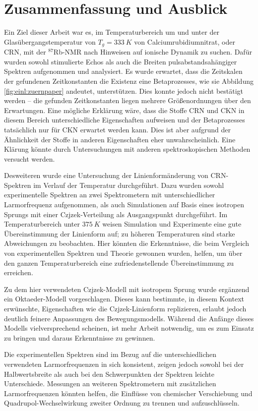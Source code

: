 \chapter{Zusammenfassung und Ausblick}

Ein Ziel dieser Arbeit war es, im Temperaturbereich um und unter der Glasübergangstemperatur von $T_g = \SI{333}{K}$ von Calciumrubidiumnitrat, oder CRN, mit der $^\text{87}$Rb-NMR nach Hinweisen auf ionische Dynamik zu suchen. Dafür wurden sowohl stimulierte Echos als auch die Breiten pulsabstandsahängiger Spektren aufgenommen und analysiert. Es wurde erwartet, dass die Zeitskalen der gefundenen Zeitkonstanten die Existenz eine Betaprozesses, wie sie Abbildung \ref{fig:einl:zuernpaper} andeutet, unterstützen. Dies konnte jedoch nicht bestätigt werden -- die gefunden Zeitkonstanten liegen mehrere Größenordnungen über den Erwartungen. Eine mögliche Erklärung wäre, dass die Stoffe CRN und CKN in diesem Bereich unterschiedliche Eigenschaften aufweisen und der Betaprozesses tatsächlich nur für CKN erwartet werden kann. Dies ist aber aufgrund der Ähnlichkeit der Stoffe in anderen Eigenschaften eher unwahrscheinlich. Eine Klärung könnte durch Untersuchungen mit anderen spektroskopischen Methoden versucht werden.

Desweiteren wurde eine Untersuchung der Linienformänderung von CRN-Spektren im Verlauf der Temperatur durchgeführt. Dazu wurden sowohl experimentelle Spektren an zwei Spektrometern mit unterschiedlicher Larmorfrequenz aufgenommen, als auch Simulationen auf Basis eines isotropen Sprungs mit einer Czjzek-Verteilung als Ausgangspunkt durchgeführt. Im Temperaturbereich unter $\SI{375}{K}$ weisen Simulation und Experimente eine gute Übereinstimmung der Linienform auf; zu höheren Temperaturen sind starke Abweichungen zu beobachten. Hier könnten die Erkenntnisse, die beim Vergleich von experimentellen Spektren und Theorie gewonnen wurden, helfen, um über den ganzen Temperaturbereich eine zufriedenstellende Übereinstimmung zu erreichen.

Zu dem hier verwendeten Czjzek-Modell mit isotropem Sprung wurde ergänzend ein Oktaeder-Modell vorgeschlagen. Dieses kann bestimmte, in diesem Kontext erwünschte, Eigenschaften wie die Czjzek-Linienform replizieren, erlaubt jedoch deutlich feinere Anpassungen des Bewegungsmodells. Während die Anfänge dieses Modells vielversprechend scheinen, ist mehr Arbeit notwendig, um es zum Einsatz zu bringen und daraus Erkenntnisse zu gewinnen.

Die experimentellen Spektren sind im Bezug auf die unterschiedlichen verwendeten Larmorfrequenzen in sich konsistent, zeigen jedoch sowohl bei der Halbwertsbreite als auch bei den Schwerpunkten der Spektren leichte Unterschiede. Messungen an weiteren Spektrometern mit zusätzlichen Larmorfrequenzen könnten helfen, die Einflüsse von chemischer Verschiebung und Quadrupol-Wechselwirkung zweiter Ordnung zu trennen und aufzuschlüsseln. 

